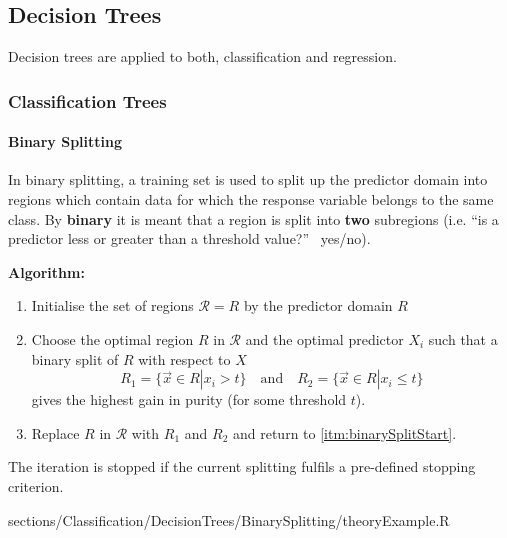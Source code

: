 \subsection{Decision Trees}

	Decision trees are applied to both, classification and regression.	

	\subsubsection{Classification Trees}	
		\paragraph{Binary Splitting}
			In binary splitting, a training set is used to split up the predictor domain into regions which contain data for which the response variable belongs to the same class. By \textbf{binary} it is meant that a region is split into \textbf{two} subregions (i.e. ``is a predictor less or greater than a threshold value?'' \textrightarrow\ yes/no).
			
			\RTheory
			{%
				\textbf{Algorithm:}
				\begin{enumerate}
				  	\item Initialise the set of regions $\mathcal{R} = {R}$ by the predictor domain $R$
				  	\item\label{itm:binarySplitStart}  Choose the optimal region $R$ in $\mathcal{R}$ and the optimal predictor $X_i$ such that a binary split of $R$ with respect to $X$
						$$R_1 = \{\vec{x} \in R | x_i > t\} \quad\mathrm{and}\quad R_2 = \{\vec{x} \in R | x_i \leq t\}$$
						gives the highest gain in purity (for some threshold $t$).
					\item Replace $R$ in $\mathcal{R}$ with $R_1$ and $R_2$ and return to \ref{itm:binarySplitStart}.
				\end{enumerate}
				
				The iteration is stopped if the current splitting fulfils a pre-defined stopping criterion.
				
			}
			{
				sections/Classification/DecisionTrees/BinarySplitting/theoryExample.R
			}
			
